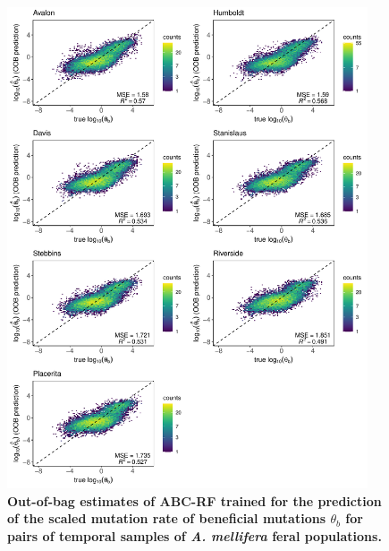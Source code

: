 \documentclass[a4paper, 12pt]{article}
\begin{document}
\begin{figure}[ht]
  \centering
  \includegraphics[width=0.95\textwidth]{Figures/FigureS16_combined_plot_thetab.pdf}
  \small\caption{\textbf{Out-of-bag estimates of ABC-RF trained for the prediction of the scaled mutation rate of beneficial mutations $\theta_{b}$ for pairs of temporal samples of \textit{A. mellifera} feral populations.}}
  \label{fig:supple_feralbee_thetab}
\end{figure}
\end{document}
